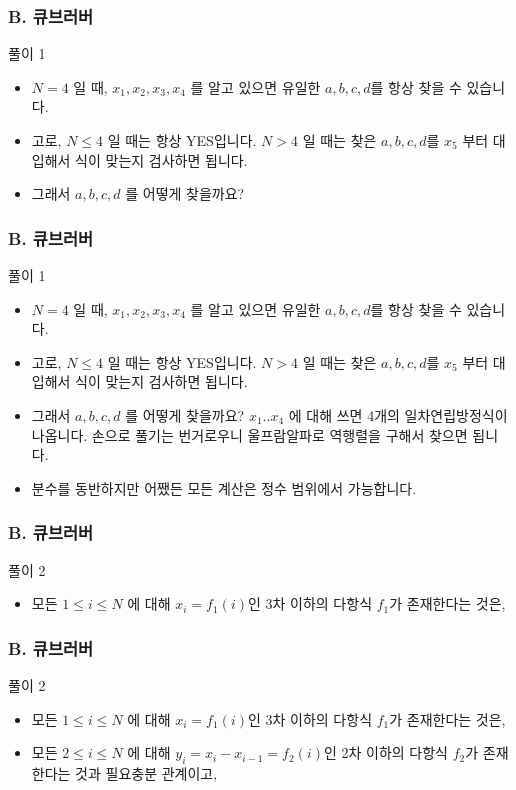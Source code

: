 \documentclass{beamer}
\begin{document}
\begin{frame}
	\frametitle{B. 큐브러버}
	\begin{block}{풀이 1}
		\begin{itemize}
			\item $N = 4$ 일 때, $x_1, x_2, x_3, x_4$ 를 알고 있으면 유일한 $a, b, c, d$를 항상 찾을 수 있습니다. 
			\item 고로, $N \leq 4$ 일 때는 항상 YES입니다. $N > 4$ 일 때는 찾은 $a, b, c, d$를 $x_5$ 부터 대입해서 식이 맞는지 검사하면 됩니다. 
			 \item 그래서 $a, b, c, d$ 를 어떻게 찾을까요? 
		\end{itemize}
	\end{block}
\end{frame}


\begin{frame}
	\frametitle{B. 큐브러버}
	\begin{block}{풀이 1}
		\begin{itemize}
			\item $N = 4$ 일 때, $x_1, x_2, x_3, x_4$ 를 알고 있으면 유일한 $a, b, c, d$를 항상 찾을 수 있습니다. 
			\item 고로, $N \leq 4$ 일 때는 항상 YES입니다. $N > 4$ 일 때는 찾은 $a, b, c, d$를 $x_5$ 부터 대입해서 식이 맞는지 검사하면 됩니다. 
			\item 그래서 $a, b, c, d$ 를 어떻게 찾을까요? $x_1 .. x_4$ 에 대해 쓰면 4개의 일차연립방정식이 나옵니다. 손으로 풀기는 번거로우니 울프람알파로 역행렬을 구해서 찾으면 됩니다. 
			\item 분수를 동반하지만 어쨌든 모든 계산은 정수 범위에서 가능합니다.
		\end{itemize}
	\end{block}
\end{frame}

\begin{frame}
	\frametitle{B. 큐브러버}
	\begin{block}{풀이 2}
		\begin{itemize}
			\item 모든 $1 \leq i \leq N$ 에 대해 $x_i = f_1(i)$인 3차 이하의 다항식 $f_1$가 존재한다는 것은, 
		\end{itemize}
	\end{block}
\end{frame}

\begin{frame}
	\frametitle{B. 큐브러버}
	\begin{block}{풀이 2}
		\begin{itemize}
			\item 모든 $1 \leq i \leq N$ 에 대해 $x_i = f_1(i)$인 3차 이하의 다항식 $f_1$가 존재한다는 것은, 
\item 모든 $2 \leq i \leq N$ 에 대해 $y_i = x_i - x_{i-1} = f_2(i)$인 2차 이하의 다항식 $f_2$가 존재한다는 것과 필요충분 관계이고,
		\end{itemize}
	\end{block}
\end{frame}
\end{document}
